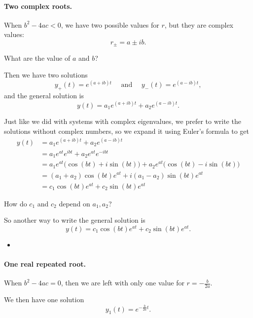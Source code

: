 \paragraph{\color{cyan}Two complex roots.} When $b^2-4ac<0$, we have two possible values for $r$, but they are complex values:
$$
r_{\pm} = a \pm ib.
$$
\begin{graybox}
What are the value of $a$ and $b$?	
\end{graybox}

Then we have two solutions
$$
y_{+}(t) = e^{(a+ib) t} \quad \text{ and } \quad y_{-}(t) = e^{(a-ib) t},
$$
and the general solution is
$$
y(t) = a_1 e^{(a+ib) t}  + a_2 e^{(a-ib) t}.
$$

Just like we did with systems with complex eigenvalues, we prefer to write the solutions without complex numbers, so we expand it using Euler's formula to get
\begin{align*}
y(t) 	& = a_1 e^{(a+ib) t}  + a_2 e^{(a-ib) t} \\
		& = a_1 e^{at}e^{ibt}  + a_2 e^{at}e^{-ibt} \\
		& = a_1 e^{at} \big( \cos(bt) + i \sin(bt) \big)  + a_2 e^{at} \big( \cos(bt) - i \sin(bt) \big) \\
		& = (a_1+a_2)  \cos(bt)e^{at} + i (a_1-a_2)\sin(bt) e^{at} \\
		& = c_1 \cos(bt)e^{at} + c_2\sin(bt) e^{at}
\end{align*}

\begin{graybox}
How do $c_1$ and $c_2$ depend on $a_1,a_2$?	
\end{graybox}

So another way to write the general solution is
$$
y(t) = c_1 \cos(bt)e^{at} + c_2\sin(bt) e^{at}.
$$


\begin{video}
\begin{itemize}
	\item {}
\end{itemize}	
\end{video}




\paragraph{\color{cyan}One real repeated root.} When $b^2-4ac=0$, then we are left with only one value for $r=-\frac{b}{2a}$.

We then have one solution
$$
y_1(t) = e^{-\frac{b}{2a}t}.
$$


